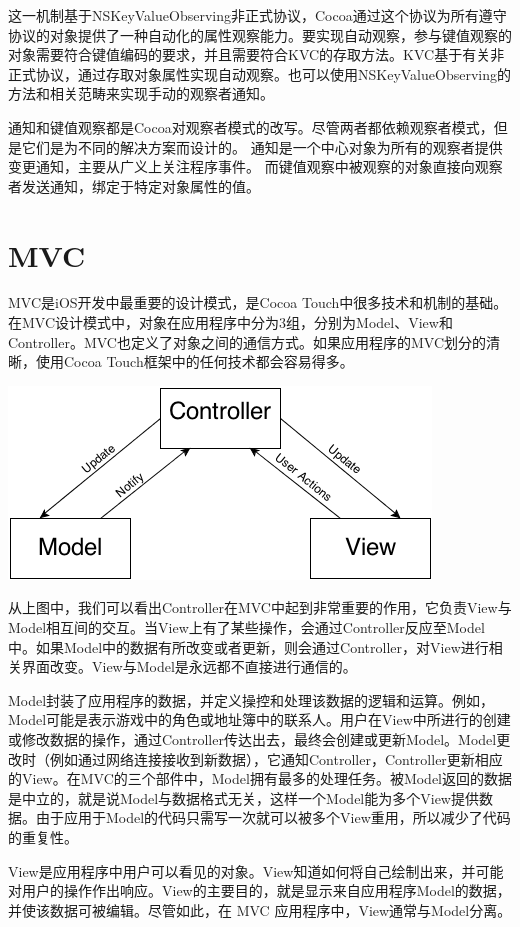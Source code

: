 \documentclass[a4paper, 12pt]{article}
\begin{document}
这一机制基于NSKeyValueObserving非正式协议，Cocoa通过这个协议为所有遵守协议的对象提供了一种自动化的属性观察能力。要实现自动观察，参与键值观察的对象需要符合键值编码的要求，并且需要符合KVC的存取方法。KVC基于有关非正式协议，通过存取对象属性实现自动观察。也可以使用NSKeyValueObserving的方法和相关范畴来实现手动的观察者通知。

通知和键值观察都是Cocoa对观察者模式的改写。尽管两者都依赖观察者模式，但是它们是为不同的解决方案而设计的。
通知是一个中心对象为所有的观察者提供变更通知，主要从广义上关注程序事件。
而键值观察中被观察的对象直接向观察者发送通知，绑定于特定对象属性的值。

\newpage

\section{MVC}
MVC是iOS开发中最重要的设计模式，是Cocoa Touch中很多技术和机制的基础。在MVC设计模式中，对象在应用程序中分为3组，分别为Model、View和Controller。MVC也定义了对象之间的通信方式。如果应用程序的MVC划分的清晰，使用Cocoa Touch框架中的任何技术都会容易得多。

\includegraphics{mvc}

从上图中，我们可以看出Controller在MVC中起到非常重要的作用，它负责View与Model相互间的交互。当View上有了某些操作，会通过Controller反应至Model中。如果Model中的数据有所改变或者更新，则会通过Controller，对View进行相关界面改变。View与Model是永远都不直接进行通信的。

Model封装了应用程序的数据，并定义操控和处理该数据的逻辑和运算。例如，Model可能是表示游戏中的角色或地址簿中的联系人。用户在View中所进行的创建或修改数据的操作，通过Controller传达出去，最终会创建或更新Model。Model更改时（例如通过网络连接接收到新数据），它通知Controller，Controller更新相应的View。在MVC的三个部件中，Model拥有最多的处理任务。被Model返回的数据是中立的，就是说Model与数据格式无关，这样一个Model能为多个View提供数据。由于应用于Model的代码只需写一次就可以被多个View重用，所以减少了代码的重复性。

View是应用程序中用户可以看见的对象。View知道如何将自己绘制出来，并可能对用户的操作作出响应。View的主要目的，就是显示来自应用程序Model的数据，并使该数据可被编辑。尽管如此，在 MVC 应用程序中，View通常与Model分离。
\end{document}
